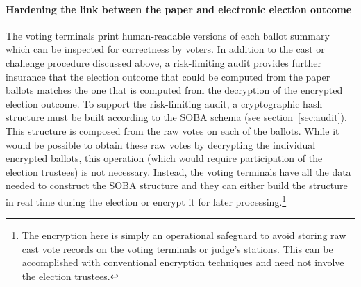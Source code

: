 \paragraph{Hardening the link between the paper and electronic
  election outcome}
\label{sec:hard-link-betw}

The voting terminals print human-readable versions of each
ballot summary which can be inspected for correctness by voters.
In addition to the cast or challenge procedure discussed above,
a risk-limiting audit provides further insurance that the
election outcome that could be computed from the paper ballots matches
the one that is computed from the decryption of the encrypted election
outcome.
To support the risk-limiting audit, a cryptographic hash structure
must be built according to the SOBA schema (see section~\ref{sec:audit}).
This structure is composed from the raw votes on each of the ballots.
While it would be possible to obtain these raw votes by decrypting the
individual encrypted ballots, this operation (which would require participation
of the election trustees) is not necessary.  Instead, the voting terminals
have all the data needed to construct the SOBA structure and they can either
build the structure in real time during the election or encrypt it for
later processing.\footnote{
The encryption here is simply an operational safeguard to avoid storing raw
cast vote records on the voting terminals or judge's stations.
This can be accomplished with conventional encryption techniques and need
not involve the election trustees.}

